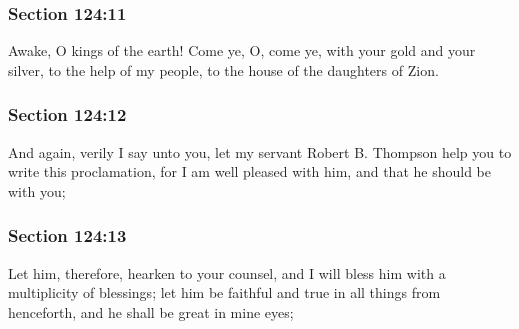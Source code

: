 	\subsubsection{Section 124:11} %
		\label{DC124-11}

		Awake, O kings of the earth!  Come ye, O, come ye, with your gold and your silver, to the help of my people, to the house of the daughters of Zion.


	\subsubsection{Section 124:12} %
		\label{DC124-12}

		And again, verily I say unto you, let my servant Robert B. Thompson help you to write this proclamation, for I am well pleased with him, and that he should be with you;


	\subsubsection{Section 124:13} %
		\label{DC124-13}

		Let him, therefore, hearken to your counsel, and I will bless him with a multiplicity of blessings; let him be faithful and true in all things from henceforth, and he shall be great in mine eyes;


